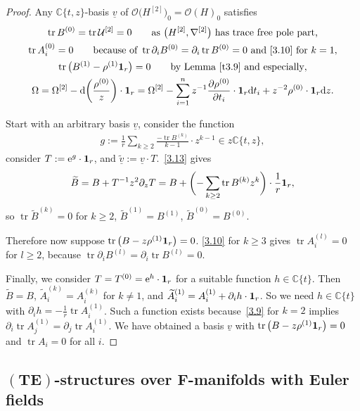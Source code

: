 \documentclass[10pt,a4paper]{amsart}
\numberwithin{equation}{section}
\numberwithin{figure}{section}
\newcommand{\C}{{\mathbb C}}
\newcommand{\OO}{{\mathcal O}}
\newcommand{\UU}{{\mathcal U}}
\newcommand{\ddd}{{\rm d}}
\newcommand{\www}{\widetilde}
\newcommand{\uuuu}{\underline}
\newcommand{\paa}{\partial}
\newcommand{\nnn}{\nabla}
\DeclareMathOperator{\tr}{tr}
\begin{document}
\begin{proof}
Any $\C\{t,z\}$-basis $\uuuu{v}$ of
$\OO\big(H^{[2]}\big)_0=\OO(H)_0$ satisfies
\begin{gather*}
\tr B^{(0)}=\tr\UU^{[2]}=0 \qquad
\text{as}\ \big(H^{[2]},\nnn^{[2]}\big)\ \text{has trace free pole part,}
\\
\tr A_i^{(0)}=0 \qquad
\text{because of}\ \tr\paa_iB^{(0)}=\paa_i\tr B^{(0)}=0
\ \text{and}\ \eqref{3.10}\ \text{for}\ k=1 ,
\\
 \tr\big(B^{(1)}- \rho^{(1)}{\bf 1}_r\big)=0 \qquad
\text{by Lemma~\ref{t3.9} and especially},
\\
\Omega =\Omega^{[2]}-\ddd\bigg(\frac{\rho^{(0)}}{z}\bigg)\cdot{\bf 1}_r
=\Omega^{[2]}-\sum_{i=1}^n z^{-1}\frac{\paa\rho^{(0)}}{\paa t_i}
\cdot{\bf 1}_r\ddd t_i + z^{-2}\rho^{(0)}\cdot{\bf 1}_r \ddd z.
\end{gather*}

Start with an arbitrary basis $\uuuu{v}$,
consider the function
\begin{gather}\label{3.20}
g:=\frac{1}{r}\sum_{k\geq 2}
\frac{-\tr B^{(k)}}{k-1}\cdot z^{k-1}\in z\C\{t,z\},
\end{gather}
{\samepage
consider $T:={\rm e}^g\cdot{\bf 1}_r$, and
$\uuuu{\www v}:=\uuuu{v}\cdot T$.~\eqref{3.13} gives
\begin{gather*}
\www B=B+T^{-1}z^2\paa_z T = B+ \bigg({-}\sum_{k\geq 2}\tr B^{(k)}z^k\bigg)\cdot \frac{1}{r}{\bf 1}_r,
\end{gather*}
so $\tr \www B^{(k)}=0$ for $k\geq 2$, $\www B^{(1)}=B^{(1)}$,
$\www B^{(0)}=B^{(0)}$.}

Therefore now suppose $\tr \big(B-z\rho^{(1)}{\bf 1}_r\big)=0$.
\eqref{3.10} for $k\geq 3$ gives
$\tr A_i^{(l)}=0$ for $l\geq 2$, because
$\tr \paa_i B^{(l)}=\paa_i \tr B^{(l)}=0$.

Finally, we consider $T=T^{(0)}={\rm e}^h\cdot{\bf 1}_r$ for a
suitable function $h\in\C\{t\}$.
Then $\www B=B$, $\www A_i^{(k)}=A_i^{(k)}$ for $k\neq 1$,
and $\www A_i^{(1)}=A_i^{(1)}+\paa_i h\cdot{\bf 1}_r$.
So we need $h\in\C\{t\}$ with
$\paa_ih=-\frac{1}{r}\tr A_i^{(1)}$.
Such a function exists because~\eqref{3.9} for $k=2$
implies $\paa_i \tr A_j^{(1)}=\paa_j \tr A_i^{(1)}$.
We have obtained a basis $\uuuu{v}$ with
$\tr\big(B-z\rho^{(1)}{\bf 1}_r\big)=0$ and $\tr A_i=0$ for all $i$.
\end{proof}

\subsection[$(TE)$-structures over $F$-manifolds with Euler fields]{$\boldsymbol{(TE)}$-structures over $\boldsymbol{F}$-manifolds with Euler fields}%
\end{document}
